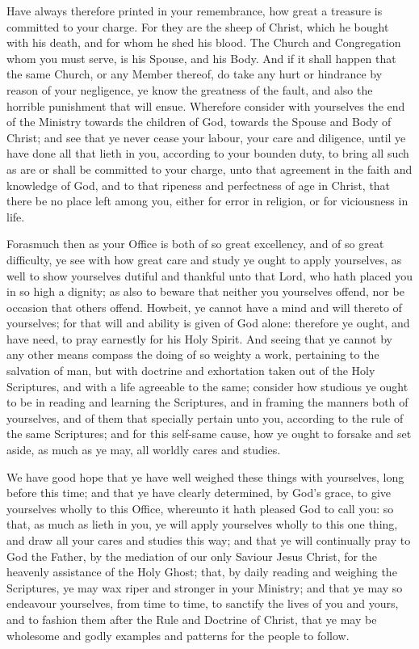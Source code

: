 Have always therefore printed in your remembrance,
how great a treasure is committed to your charge. For they are the sheep
of Christ, which he bought with his death, and for whom he shed his
blood. The Church and Congregation whom you must serve, is his Spouse,
and his Body. And if it shall happen that the same Church, or any Member
thereof, do take any hurt or hindrance by reason of your negligence,
ye know the greatness of the fault, and also the horrible punishment
that will ensue. Wherefore consider with yourselves the end of the Ministry
towards the children of God, towards the Spouse and Body of Christ;
and see that ye never cease your labour, your care and diligence, until
ye have done all that lieth in you, according to your bounden duty,
to bring all such as are or shall be committed to your charge, unto
that agreement in the faith and knowledge of God, and to that ripeness
and perfectness of age in Christ, that there be no place left among
you, either for error in religion, or for viciousness in life.

Forasmuch then as your Office is both of so
great excellency, and of so great difficulty, ye see with how great
care and study ye ought to apply yourselves, as well to show yourselves
dutiful and thankful unto that Lord, who hath placed you in so high
a dignity; as also to beware that neither you yourselves offend, nor
be occasion that others offend. Howbeit, ye cannot have a mind and will
thereto of yourselves; for that will and ability is given of God alone:
therefore ye ought, and have need, to pray earnestly for his Holy Spirit.
And seeing that ye cannot by any other means compass the doing of so
weighty a work, pertaining to the salvation of man, but with doctrine
and exhortation taken out of the Holy Scriptures, and with a life agreeable
to the same; consider how studious ye ought to be in reading and learning
the Scriptures, and in framing the manners both of yourselves, and of
them that specially pertain unto you, according to the rule of the same
Scriptures; and for this self-same cause, how ye ought to forsake and
set aside, as much as ye may, all worldly cares and studies.

We have good hope that ye have well weighed these
things with yourselves, long before this time; and that ye have clearly
determined, by God's grace, to give yourselves wholly to this Office,
whereunto it hath pleased God to call you: so that, as much as lieth
in you, ye will apply yourselves wholly to this one thing, and draw
all your cares and studies this way; and that ye will continually pray
to God the Father, by the mediation of our only Saviour Jesus Christ,
for the heavenly assistance of the Holy Ghost; that, by daily reading
and weighing the Scriptures, ye may wax riper and stronger in your Ministry;
and that ye may so endeavour yourselves, from time to time, to sanctify
the lives of you and yours, and to fashion them after the Rule and Doctrine
of Christ, that ye may be wholesome and godly examples and patterns
for the people to follow.

